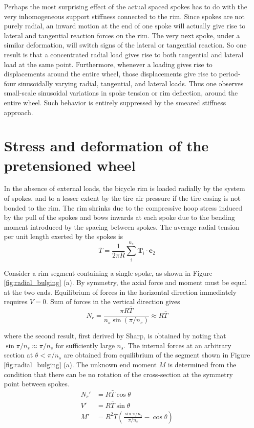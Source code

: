 \documentclass[../thesis.tex]{subfiles}
\newcommand{\et}{\mathbf{e}_2}
\begin{document}
Perhaps the most surprising effect of the actual spaced spokes has to do with the very inhomogeneous support stiffness connected to the rim. Since spokes are not purely radial, an inward motion at the end of one spoke will actually give rise to lateral and tangential reaction forces on the rim. The very next spoke, under a similar deformation, will switch signs of the lateral or tangential reaction. So one result is that a concentrated radial load gives rise to both tangential and lateral load at the same point. Furthermore, whenever a loading gives rise to displacements around the entire wheel, those displacements give rise to period-four sinusoidally varying radial, tangential, and lateral loads. Thus one observes small-scale sinusoidal variations in spoke tension or rim deflection, around the entire wheel. Such behavior is entirely suppressed by the smeared stiffness approach.


\section{Stress and deformation of the pretensioned wheel}

In the absence of external loads, the bicycle rim is loaded radially by the system of spokes, and to a lesser extent by the tire air pressure if the tire casing is not bonded to the rim\cite{Burgoyne}. The rim shrinks due to the compressive hoop stress induced by the pull of the spokes and bows inwards at each spoke due to the bending moment introduced by the spacing between spokes. The average radial tension per unit length exerted by the spokes is
\begin{equation}
\label{eq:Tbar}
\bar{T} = \frac{1}{2\pi R} \sum_i^{n_s} \mathbf{T}_i\cdot\et
\end{equation}

Consider a rim segment containing a single spoke, as shown in Figure \ref{fig:radial_bulging} (a). By symmetry, the axial force and moment must be equal at the two ends. Equilibrium of forces in the horizontal direction immediately requires $V=0$. Sum of forces in the vertical direction gives
\begin{equation}
\label{eq:Nr}
N_r = \frac{\pi R\bar{T}}{n_s\sin{(\pi/n_s)}} \approx R\bar{T}
\end{equation}

where the second result, first derived by Sharp\cite{Sharp}, is obtained by noting that $\sin{\pi/n_s}\approx \pi/n_s$ for sufficiently large $n_s$. The internal forces at an arbitrary section at $\theta < \pi/n_s$ are obtained from equilibrium of the segment shown in Figure \ref{fig:radial_bulging} (a). The unknown end moment $M$ is determined from the condition that there can be no rotation of the cross-section at the symmetry point between spokes.
\begin{subequations}
\begin{align}
\label{eq:NVM}
N_r' &= R\bar{T}\cos{\theta}\\
V'   &= R\bar{T}\sin{\theta}\\
M'   &= R^2\bar{T} \left( \frac{\sin{\pi/n_s}}{\pi/n_s} - \cos{\theta} \right)
\end{align}
\end{subequations}
\end{document}
